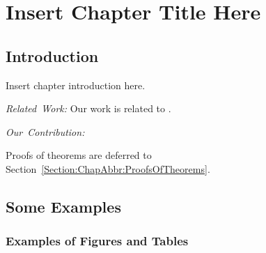 
\chapter{Insert Chapter Title Here}
\label{Section:ChapAbbr}



\section{Introduction}
\label{Section:ChapAbbr:Introduction}

Insert chapter introduction here.
\lipsum[1-2]

\mbox{\textit{Related Work:}}
Our work is related to \cite{Examples:Conference01, Examples:Journal01, Examples:Conference02, Examples:Journal02, Examples:Conference03}.
\lipsum[3-4]

\mbox{\textit{Our Contribution:}}
\lipsum[5-6]

Proofs of theorems are deferred to Section~\ref{Section:ChapAbbr:ProofsOfTheorems}.


\section{Some Examples}
\label{Section:ChapAbbr:SomeExamples}

\lipsum[7]


\subsection{Examples of Figures and Tables}
\label{Section:ChapAbbr:SomeExamples:FiguresTables}

